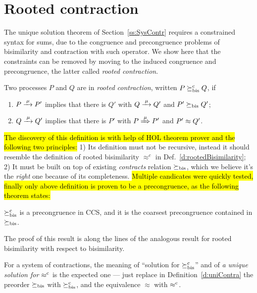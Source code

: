 \section{Rooted contraction}
\label{ss:new}

The unique solution theorem of Section~\ref{ss:SysContr} requires a
constrained syntax for sums, due to the congruence and precongruence
problems of bisimilarity and contraction with such operator. 
We show here that the constraints can be
removed by moving to the induced congruence and precongruence, the
latter 
called \emph{rooted contraction}.
\begin{definition}
\label{d:rcontra}
Two processes $P$ and $Q$ are in \emph{rooted contraction}, written 
 $P\mathrel{\succeq^{\rm{c}}_{\rm{bis}}} Q$, if
\begin{enumerate}
\item $P \arr\mu P'$ implies that there is $Q'$ with $Q \arr \mu Q'$
 and $P'\mathrel{\succeq_{\rm{bis}}} Q'$;
\item $Q \arr\mu Q'$   implies that there is $P'$ with $P \Arr \mu
 P'$ and $P' \approx Q'$.
\end{enumerate}
\end{definition}


\hl{The discovery of this definition is with help of HOL theorem
  prover and
the following two principles:} 1) Its definition must not be recursive,
instead it should resemble the definition of rooted bisimilarity
$\approx^c$ in Def.~\ref{d:rootedBisimilarity};
2) It must be built on top of existing \emph{contracts}
relation $\mathrel{\succeq_{\rm{bis}}}$, which we believe it's the \emph{right} one
because of its completeness. \hl{Multiple candicates were quickly tested,
finally only above definition is proven to be a precongruence, as the
following theorem states:}

\begin{theorem}
\label{t:rcontrPrecongruence}
$\mathrel{\succeq^{\rm{c}}_{\rm{bis}}}$ is a precongruence in CCS, and it is the
coarsest precongruence contained in $\mathrel{\succeq_{\rm{bis}}}$.
\end{theorem}  
The proof of this result is along the lines of the analogous result
for rooted bisimilarity with respect to bisimilarity. 

For a system of contractions, the meaning of 
``solution for $\mathrel{\succeq^{\rm{c}}_{\rm{bis}}}$'' and of 
 \emph{a unique 
solution for $\mathrel{\approx^{\rm{c}}}$}
is the expected one --- just replace in Definition~\ref{d:uniContra}  the preorder 
$\mathrel{\succeq_{\rm{bis}}}$ with $\mathrel{\succeq^{\rm{c}}_{\rm{bis}}}$, and the equivalence 
$\approx$ with $\mathrel{\approx^{\rm{c}}}$.

